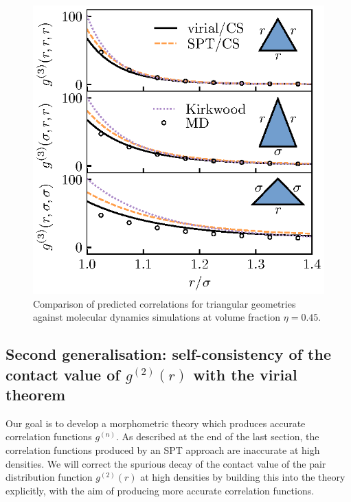 \documentclass[11pt,twoside]{report}
\begin{document}
\begin{figure}
  \includegraphics[width=0.9\linewidth,outer]{g3}
  \caption[Accuracy of triplet distribution functions $g^{(3)}(r,s,t)$]{
    Comparison of predicted correlations for triangular geometries against molecular dynamics simulations at volume fraction $\eta = 0.45$.}
  \label{fig:g3}
\end{figure}

\subsection{Second generalisation: self-consistency of the contact value of $g^{(2)}(r)$ with the virial theorem}
\label{sec:virial-spt}

Our goal is to develop a morphometric theory which produces accurate correlation functions $g^{(n)}$.
As described at the end of the last section, the correlation functions produced by an SPT approach are inaccurate at high densities.
We will correct the spurious decay of the contact value of the pair distribution function $g^{(2)}(r)$ at high densities by building this into the theory explicitly, with the aim of producing more accurate correlation functions.

\end{document}
